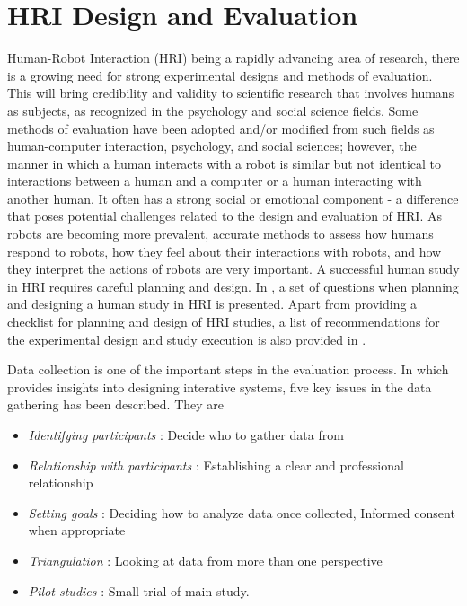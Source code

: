 {\section{HRI Design and Evaluation} %
Human-Robot Interaction (HRI) being a rapidly advancing area of research, there is a growing need for strong experimental designs and methods of evaluation. This will bring credibility and validity to scientific research that involves humans as subjects, as recognized in the psychology and social science fields. Some methods of evaluation have been adopted and/or modified from such fields as human-computer interaction, psychology, and social sciences; however, the manner in which a human interacts with a robot is similar but not identical to interactions between a human and a computer or a human interacting with another human. It often has a strong social or emotional component - a difference that poses potential challenges related to the design and evaluation of HRI. As robots are becoming more prevalent, accurate methods to assess how humans respond to robots, how they feel about their interactions with robots, and how they interpret the actions of robots are very important. 
A successful human study in HRI requires careful planning and design. In \cite{bethel2010review}, a set of questions when planning and designing a human study in HRI is presented. Apart from providing a checklist for planning and design of HRI studies, a list of recommendations for the experimental design and study execution is also provided in \cite{bethel2010review}.
	
Data collection is one of the important steps in the evaluation process. In \cite{Rogers2011} which provides insights into designing interative systems, five key issues in the data gathering has been described. They are 
\begin{itemize}
\item \emph{Identifying participants} : Decide who to gather data from
\item \emph{Relationship with participants} : Establishing a clear and professional relationship
\item \emph{Setting goals} : Deciding how to analyze data once collected, Informed consent when appropriate
\item \emph{Triangulation} : Looking at data from more than one perspective
\item \emph{Pilot studies} : Small trial of main study. 
\end{itemize}

}
